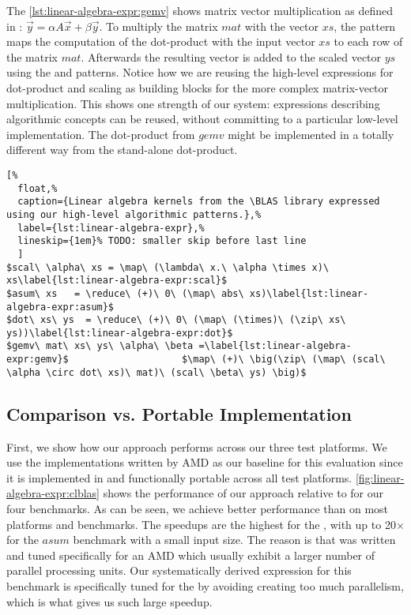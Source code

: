 The \autoref{lst:linear-algebra-expr:gemv} shows matrix vector multiplication as defined in \BLAS: $\vec{y} = \alpha A \vec{x} + \beta \vec{y}$.
To multiply the matrix $mat$ with the vector $xs$, the \map pattern maps the computation of the dot-product with the input vector $xs$ to each row of the matrix $mat$.
Afterwards the resulting vector is added to the scaled vector $ys$ using the \zip and \map patterns.
Notice how we are reusing the high-level expressions for dot-product and scaling as building blocks for the more complex matrix-vector multiplication.
This shows one strength of our system: expressions describing algorithmic concepts can be reused, without committing to a particular low-level implementation.
The dot-product from $gemv$ might be implemented in a totally different way from the stand-alone dot-product.

\begin{lstlisting}[%
  float,%
  caption={Linear algebra kernels from the \BLAS library expressed using our high-level algorithmic patterns.},%
  label={lst:linear-algebra-expr},%
  lineskip={1em}% TODO: smaller skip before last line
  ]
$scal\ \alpha\ xs = \map\ (\lambda\ x.\ \alpha \times x)\ xs\label{lst:linear-algebra-expr:scal}$
$asum\ xs   = \reduce\ (+)\ 0\ (\map\ abs\ xs)\label{lst:linear-algebra-expr:asum}$
$dot\ xs\ ys  = \reduce\ (+)\ 0\ (\map\ (\times)\ (\zip\ xs\ ys))\label{lst:linear-algebra-expr:dot}$
$gemv\ mat\ xs\ ys\ \alpha\ \beta =\label{lst:linear-algebra-expr:gemv}$                    $\map\ (+)\ \big(\zip\ (\map\ (scal\ \alpha \circ dot\ xs)\ mat)\ (scal\ \beta\ ys) \big)$
\end{lstlisting}




\subsection{Comparison vs. Portable Implementation}


First, we show how our approach performs across our three test platforms.
We use the \BLAS \OpenCL implementations written by AMD as our baseline for this evaluation since it is implemented in \OpenCL and functionally portable across all test platforms.
\autoref{fig:linear-algebra-expr:clblas} shows the performance of our approach relative to \clBLAS for our four benchmarks.
As can be seen, we achieve better performance than \clBLAS on most platforms and benchmarks.
The speedups are the highest for the \CPU, with up to 20$\times$ for the $asum$ benchmark with a small input size.
The reason is that \clBLAS was written and tuned specifically for an AMD \GPU which usually exhibit a larger number of parallel processing units.
Our systematically derived expression for this benchmark is specifically tuned for the \CPU by avoiding creating too much parallelism, which is what gives us such large speedup.




